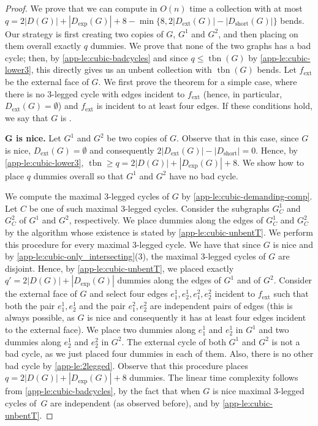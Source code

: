 \documentclass[runningheads]{llncs}
\newcommand{\tbn}{\operatorname{tbn}}
\newcommand{\ext}{\operatorname{ext}}
\newcommand{\short}{\operatorname{short}}
\let\emph\relax\DeclareTextFontCommand{\emph}{\color{dark blue}\em}
\begin{document}
\begin{proof}
We prove that we can compute in $O(n)$ time a collection with at most $q=2|D(G)|+|D_{\exp}(G)|+8-\min\{8, 2|D_{\ext}(G)|-|D_{\short}(G)|\} $ bends. %
Our strategy is first creating two copies of $G$, $G^1$ and $G^2$, and then placing on them overall exactly $q$ dummies. We prove that none of the two graphs has a bad cycle; then, by \cref{app-le:cubic-badcycles} and since $q\le \tbn(G)$ by \cref{app-le:cubic-lower3}, this directly gives us an unbent collection with $\tbn(G)$ bends. Let $f_{\ext}$ be the external face of $G$. We first prove the theorem for a simple case, where there is no 3-legged cycle with edges incident to $f_{\ext}$ (hence, in particular, $D_{\ext}(G)=\emptyset$) and $f_{\ext}$ is incident to at least four edges. If these conditions hold, we say that $G$ is \emph{nice}. 

\smallskip \noindent
{\sffamily\bfseries G is nice.} Let $G^1$ and $G^2$ be two copies of $G$. Observe that in this case, since $G$ is nice, $D_{\ext}(G)=\emptyset$ and consequently $2|D_{\ext}(G)|-|D_{\short}|=0$. Hence, by \cref{app-le:cubic-lower3}, $\tbn\ge q=2|D(G)|+|D_{\exp}(G)|+8$. We show how to place $q$ dummies overall so that $G^1$ and $G^2$ have no bad cycle. %


We compute the maximal 3-legged cycles of $G$ by \cref{app-le:cubic-demanding-comp}.  Let $C$ be one of such maximal 3-legged cycles.  
Consider the subgraphs $G^1_C$ and $G^2_C$ of $G^1$ and $G^2$, respectively. 
We place dummies along the edges of $G^1_C$ and $G^2_C$ by the algorithm whose existence is stated by \cref{app-le:cubic-unbentT}. We perform this procedure for every maximal 3-legged cycle. We have that since $G$ is nice and by \cref{app-le:cubic-only_intersecting}(3), the maximal 3-legged cycles of $G$ are disjoint. Hence, by \cref{app-le:cubic-unbentT}, we placed exactly $q'=2|D(G)|+|D_{\exp}(G)|$ dummies along the edges of $G^1$ and of $G^2$.  Consider the external face of $G$ and select four edges $e_1^1,e_2^1,e_1^2,e_2^2$ incident to $f_{\ext}$ such that both the pair $e_1^1, e_2^1$ and the pair $e_1^2,e_2^2$ are independent pairs of edges (this is always possible, as $G$ is nice and consequently it has at least four edges incident to the external face). 
We place two dummies along $e_1^1$ and $e_2^1$ in $G^1$ and two dummies along $e_2^1$ and $e_2^2$ in $G^2$. The external cycle of both $G^1$ and $G^2$ is not a bad cycle, as we just placed four dummies in each of them. Also, there is no other bad cycle by \cref{app-le:2legged}.
 Observe that this procedure places $q=2|D(G)|+|D_{\exp}(G)|+8$ dummies.  The linear time complexity follows from \cref{app-le:cubic-badcycles}, by the fact that when $G$ is nice maximal 3-legged cycles of~$G$ are independent (as observed before), and by \cref{app-le:cubic-unbentT}.


\end{proof}
\end{document}
